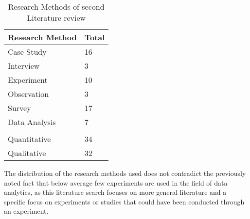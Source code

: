 \begin{table}[htbp]
    \centering
    \begin{tabular}{ll}
    \hline
    \multicolumn{1}{|l|}{Research Method} & \multicolumn{1}{l|}{Total} \\ \hline
    \multicolumn{1}{|l|}{Case  Study}     & \multicolumn{1}{l|}{16}    \\ \hline
    \multicolumn{1}{|l|}{Interview}       & \multicolumn{1}{l|}{3}     \\ \hline
    \multicolumn{1}{|l|}{Experiment}      & \multicolumn{1}{l|}{10}    \\ \hline
    \multicolumn{1}{|l|}{Observation}     & \multicolumn{1}{l|}{3}     \\ \hline
    \multicolumn{1}{|l|}{Survey}          & \multicolumn{1}{l|}{17}    \\ \hline
    \multicolumn{1}{|l|}{Data Analysis}   & \multicolumn{1}{l|}{7}     \\ \hline
                                          &                            \\ \hline
    \multicolumn{1}{|l|}{Quantitative}    & \multicolumn{1}{l|}{34}    \\ \hline
    \multicolumn{1}{|l|}{Qualitative}     & \multicolumn{1}{l|}{32}    \\ \hline
    \end{tabular}
    \caption[Research Methods of second Literature review]{Research Methods of second Literature review}\label{tab:secondLiteratureSearch}
    \end{table}


The distribution of the research methods used does not contradict the previously noted fact that below average few experiments are used in the field of data analytics, as this literature search focuses on more general literature and a specific focus on experiments or studies that could have been conducted through an experiment.

